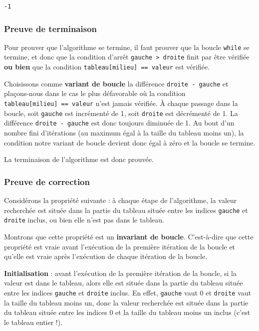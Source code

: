 \documentclass[
  a4paper,
  DIV=11,
  numbers=noendperiod]{scrartcl}
\begin{document}
\begin{verbatim}
-1
\end{verbatim}

\hypertarget{preuve-de-terminaison}{%
\subsubsection{Preuve de terminaison}\label{preuve-de-terminaison}}

Pour prouver que l'algorithme se termine, il faut prouver que la boucle
\texttt{while} se termine, et donc que la condition d'arrêt
\texttt{gauche\ \textgreater{}\ droite} finit par être vérifiée
\textbf{ou bien} que la condition
\texttt{tableau{[}milieu{]}\ ==\ valeur} est vérifiée.

Choisissons comme \textbf{variant de boucle} la différence
\texttt{droite\ -\ gauche} et plaçons-nous dans le cas le plus
défavorable où la condition \texttt{tableau{[}milieu{]}\ ==\ valeur}
n'est jamais vérifiée. À chaque passage dans la boucle, soit
\texttt{gauche} est incrémenté de 1, soit \texttt{droite} est décrémenté
de 1. La différence \texttt{droite\ -\ gauche} est donc toujours
diminuée de 1. Au bout d'un nombre fini d'itérations (au maximum égal à
la taille du tableau moins un), la condition notre variant de boucle
devient donc égal à zéro et la boucle se termine.

La terminaison de l'algorithme est donc prouvée.

\hypertarget{preuve-de-correction}{%
\subsubsection{Preuve de correction}\label{preuve-de-correction}}

Considérons la propriété suivante : à chaque étape de l'algorithme, la
valeur recherchée est située dans la partie du tableau située entre les
indices \texttt{gauche} et \texttt{droite} inclus, ou bien elle n'est
pas dans le tableau.

Montrons que cette propriété est un \textbf{invariant de boucle}.
C'est-à-dire que cette propriété est vraie avant l'exécution de la
première itération de la boucle et qu'elle est vraie après l'exécution
de chaque itération de la boucle.

\textbf{Initialisation} : avant l'exécution de la première itération de
la boucle, si la valeur est dans le tableau, alors elle est située dans
la partie du tableau située entre les indices \texttt{gauche} et
\texttt{droite} inclus. En effet, \texttt{gauche} vaut 0 et
\texttt{droite} vaut la taille du tableau moins un, donc la valeur
recherchée est située dans la partie du tableau située entre les indices
0 et la taille du tableau moins un inclus (c'est le tableau entier !).
\end{document}
